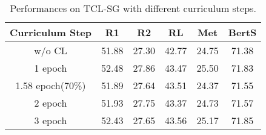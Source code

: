 \begin{table}[th]
	\scriptsize
	\centering
	\begin{tabular}{cccccc}
		\hline
		{Curriculum Step} & {R1} & {R2} & {RL} & {Met} & {BertS} \\
		\hline
		w/o CL & 51.88 & 27.30 & 42.77 & 24.75 & 71.38 \\
		\hline
		1 epoch & 52.48 & 27.86 & 43.47 & 25.50 &71.83 \\
		1.58 epoch(70\%) & 51.89 & 27.64 & 43.51 & 24.37 &71.55 \\
		2 epoch & 51.93 & 27.75 & 43.37 & 24.73 & 71.57\\
		3 epoch & 52.43 & 27.65 & 43.56 & 25.17 & 71.85\\
		\hline
	\end{tabular}
	\caption{Performances on TCL-SG with different curriculum steps.}
	\label{tab:tclpre2}
\end{table}




